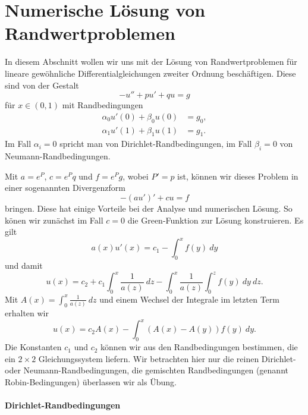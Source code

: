 \chapter{Numerische Lösung von Randwertproblemen} 

In diesem Abschnitt wollen wir uns mit der Lösung von Randwertproblemen für lineare gewöhnliche Differentialgleichungen zweiter Ordnung besch\"aftigen. Diese sind von der Gestalt
\begin{equation}
 - u'' + p u' + q u= g  
\end{equation}
f\"ur $x\in (0,1)$ mit Randbedingungen
\begin{align}
	 \alpha_0 u'(0) + \beta_0 u(0) &= g_0, \label{rb1}\\
	 \alpha_1 u'(1) + \beta_1 u(1) &= g_1. \label{rb2}
\end{align}
Im Fall $\alpha_i = 0$ spricht man von Dirichlet-Randbedingungen, im Fall $\beta_i=0$ von Neumann-Randbedingungen. 

Mit $a=e^P$, $c=e^P q$ und $f=e^P g$, wobei $P' = p$ ist, k\"onnen wir dieses Problem in einer sogenannten Divergenzform
\begin{equation}
	-(au')' + c u = f \label{divergenzform}
\end{equation}
bringen. Diese hat einige Vorteile bei  der Analyse und numerischen L\"osung. So k\"onen wir zun\"achst im Fall $c=0$ die Green-Funktion zur L\"osung konstruieren. Es gilt
$$ a(x) u'(x) = c_1 - \int_0^x f(y) ~dy $$
und damit 
$$ u(x) = c_2 + c_1 \int_0^x \frac{1}{a(z)}~dz - \int_0^x \frac{1}{a(z)}   \int_0^z f(y) ~dy~dz. $$
Mit $A(x) = \int_0^x \frac{1}{a(z)}~dz$ und einem Wechsel der Integrale im letzten Term erhalten wir
$$ u(x) = c_2 A(x) - \int_0^x (A(x) - A(y)) f(y)~dy. $$ 
Die Konstanten $c_1$ und $c_2$ k\"onnen wir aus den Randbedingungen bestimmen, die ein $2 \times 2$ Gleichungssystem liefern. Wir 
betrachten hier nur die reinen Dirichlet- oder Neumann-Randbedingungen, die gemischten Randbedingungen (genannt Robin-Bedingungen) überlassen wir als Übung.  

\subsubsection*{Dirichlet-Randbedingungen}

